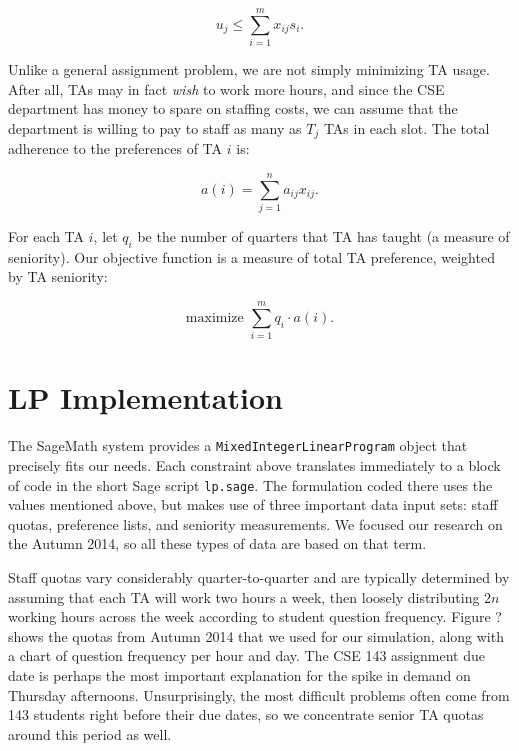 \documentclass{article}
\begin{document}
\begin{multicols}{2}
\begin{equation}
u_j \leq \sum_{i=1}^{m}x_{ij}s_i.
\end{equation}

Unlike a general assignment problem, we are not simply minimizing TA usage. After all, TAs may in fact \textit{wish} to work more hours, and since the CSE department has money to spare on staffing costs, we can assume that the department is willing to pay to staff as many as $T_j$ TAs in each slot. The total adherence to the preferences of TA $i$ is:

\begin{equation}
a(i) = \sum_{j=1}^na_{ij}x_{ij}.
\end{equation}

For each TA $i$, let $q_i$ be the number of quarters that TA has taught (a measure of seniority). Our objective function is a measure of total TA preference, weighted by TA seniority:

\begin{equation}
\textrm{maximize } \sum_{i=1}^mq_i\cdot a(i).
\end{equation}

\section*{LP Implementation}

The SageMath system provides a \texttt{MixedIntegerLinearProgram} object that precisely fits our needs. Each constraint above translates immediately to a block of code in the short Sage script \texttt{lp.sage}. The formulation coded there uses the values mentioned above, but makes use of three important data input sets: staff quotas, preference lists, and seniority measurements. We focused our research on the Autumn 2014, so all these types of data are based on that term.

Staff quotas vary considerably quarter-to-quarter and are typically determined by assuming that each TA will work two hours a week, then loosely distributing $2n$ working hours across the week according to student question frequency. Figure ? shows the quotas from Autumn 2014 that we used for our simulation, along with a chart of question frequency per hour and day. The CSE 143 assignment due date is perhaps the most important explanation for the spike in demand on Thursday afternoons. Unsurprisingly, the most difficult problems often come from 143 students right before their due dates, so we concentrate senior TA quotas around this period as well.


\end{multicols}
\end{document}
